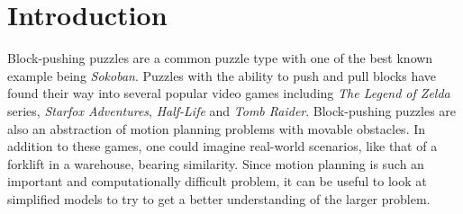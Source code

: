 
\section{Introduction} 

Block-pushing puzzles are a common puzzle type with one of the best known example being \emph{Sokoban}. Puzzles with the ability to push and pull blocks have found their way into several popular video games including \emph{The Legend of Zelda} series, \emph{Starfox Adventures}, \emph{Half-Life} and \emph{Tomb Raider}. Block-pushing puzzles are also an abstraction of motion planning problems with movable obstacles. In addition to these games, one could imagine real-world scenarios, like that of a forklift in a warehouse, bearing similarity. Since motion planning is such an important and computationally difficult problem, it can be useful to look at simplified models to try to get a better understanding of the larger problem.



